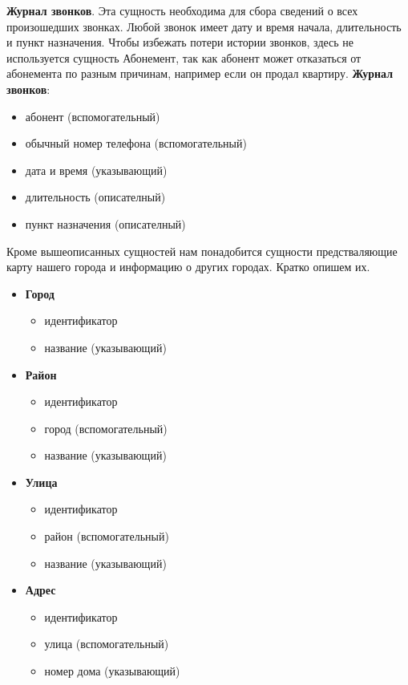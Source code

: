 \documentclass{report}
\begin{document}
\textbf{Журнал звонков}. Эта сущность необходима для сбора сведений 
о всех произошедших звонках. Любой звонок имеет дату и время начала,
длительность и пункт назначения. Чтобы избежать потери истории звонков, 
здесь не используется сущность Абонемент, 
так как абонент может отказаться от абонемента по разным причинам, 
например если он продал квартиру.
\newline\textbf{Журнал звонков}:
\begin{itemize}
    \item абонент (вспомогательный)
    \item обычный номер телефона (вспомогательный)
    \item дата и время (указывающий)
    \item длительность (описателный)
    \item пункт назначения (описателный)
\end{itemize}

Кроме вышеописанных сущностей нам понадобится сущности предстваляющие карту 
нашего города и информацию о других городах. Кратко опишем их.
\begin{itemize}
    \item[] \textbf{Город}
    \begin{itemize}
        \item идентификатор
        \item название (указывающий)
    \end{itemize}
    \item[] \textbf{Район}
    \begin{itemize}
        \item идентификатор
        \item город (вспомогательный)
        \item название (указывающий)
    \end{itemize} 
    \item[] \textbf{Улица}
    \begin{itemize}
        \item идентификатор
        \item район (вспомогательный)
        \item название (указывающий)
    \end{itemize} 
    \item[] \textbf{Адрес}
    \begin{itemize}
        \item идентификатор
        \item улица (вспомогательный)
        \item номер дома (указывающий)
    \end{itemize} 
\end{itemize}
\end{document}
